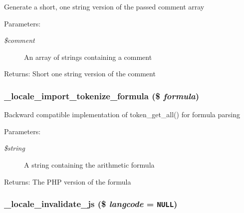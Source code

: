 Generate a short, one string version of the passed comment array

\begin{Desc}
\item[Parameters:]
\begin{description}
\item[{\em \$comment}]An array of strings containing a comment \end{description}
\end{Desc}
\begin{Desc}
\item[Returns:]Short one string version of the comment \end{Desc}
\hypertarget{group__locale_g53c242ca7adfb5ccc25ebfedab8214a5}{
\subsubsection[{\_\-locale\_\-import\_\-tokenize\_\-formula}]{\setlength{\rightskip}{0pt plus 5cm}\_\-locale\_\-import\_\-tokenize\_\-formula (\$ {\em formula})}}
\label{group__locale_g53c242ca7adfb5ccc25ebfedab8214a5}


Backward compatible implementation of token\_\-get\_\-all() for formula parsing

\begin{Desc}
\item[Parameters:]
\begin{description}
\item[{\em \$string}]A string containing the arithmetic formula \end{description}
\end{Desc}
\begin{Desc}
\item[Returns:]The PHP version of the formula \end{Desc}
\hypertarget{group__locale_ge1eec455fe9fcd01af98bb37ff4096ae}{
\subsubsection[{\_\-locale\_\-invalidate\_\-js}]{\setlength{\rightskip}{0pt plus 5cm}\_\-locale\_\-invalidate\_\-js (\$ {\em langcode} = {\tt NULL})}}
\label{group__locale_ge1eec455fe9fcd01af98bb37ff4096ae}


